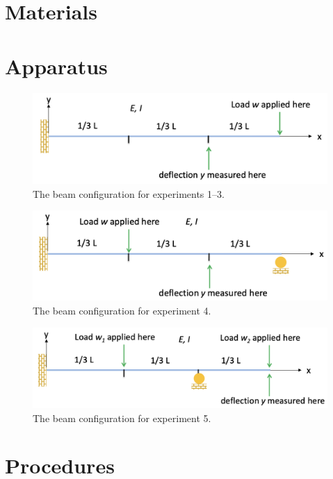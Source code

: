 \documentclass[12 pt]{article}
\begin{document}
\section{Materials} \label{materials}

\section{Apparatus} \label{apparatus}
\begin{figure}[htbp]
\centering
\includegraphics[width=6in]{images/Config 1-3}
\caption{The beam configuration for experiments 1--3.}
\label{fig:config_1-3}
\end{figure}

\begin{figure}[htbp]
\centering
\includegraphics[width=6in]{images/Config 4}
\caption{The beam configuration for experiment 4.}
\label{fig:config_4}
\end{figure}

\begin{figure}[htbp]
\centering
\includegraphics[width=6in]{images/Config 5}
\caption{The beam configuration for experiment 5.}
\label{fig:config_5}
\end{figure}

\section{Procedures} \label{procedures}
\end{document}
